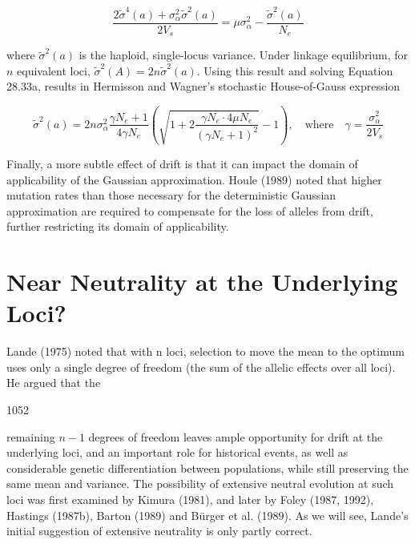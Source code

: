 \documentclass{article}
\begin{document}
\begin{equation}
\frac{2\widetilde{\sigma}^{4}(a)+\sigma_{\alpha}^{2}\widetilde{\sigma}^{2}(a)}{2V_{s}}=\mu\sigma_{\alpha}^{2}-\frac{\widetilde{\sigma}^{2}(a)}{N_{e}}
\tag{28.33a}
\label{eq:28_33a}
\end{equation}

where  $ \widetilde{\sigma}^{2}(a) $ is the haploid, single-locus variance. Under linkage equilibrium, for  $ n $ equivalent loci,  $ \widetilde{\sigma}^{2}(A) = 2n\widetilde{\sigma}^{2}(a) $. Using this result and solving Equation 28.33a, results in Hermisson and Wagner's stochastic House-of-Gauss expression

\begin{equation}
\widetilde{\sigma}^{2}(a)=2n\sigma_{\alpha}^{2}\frac{\gamma N_{e}+1}{4\gamma N_{e}}\left(\sqrt{1+2\frac{\gamma N_{e}\cdot4\mu N_{e}}{(\gamma N_{e}+1)^{2}}}-1\right),\quad\mathrm{w h e r e}\quad\gamma=\frac{\sigma_{\alpha}^{2}}{2V_{s}}
\tag{28.33b}
\label{eq:28_33b}
\end{equation}

Finally, a more subtle effect of drift is that it can impact the domain of applicability of the Gaussian approximation. Houle (1989) noted that higher mutation rates than those necessary for the deterministic Gaussian approximation are required to compensate for the loss of alleles from drift, further restricting its domain of applicability.

\section{Near Neutrality at the Underlying Loci?}
Lande (1975) noted that with n loci, selection to move the mean to the optimum uses only a single degree of freedom (the sum of the allelic effects over all loci). He argued that the

1052

remaining  $ n-1 $ degrees of freedom leaves ample opportunity for drift at the underlying loci, and an important role for historical events, as well as considerable genetic differentiation between populations, while still preserving the same mean and variance. The possibility of extensive neutral evolution at such loci was first examined by Kimura (1981), and later by Foley (1987, 1992), Hastings (1987b), Barton (1989) and Bürger et al. (1989). As we will see, Lande's initial suggestion of extensive neutrality is only partly correct.
\end{document}
